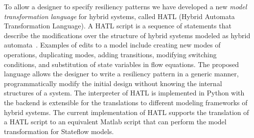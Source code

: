 %
%

%
%
%

%
%
To allow a designer to specify resiliency patterns we have developed a new \emph{model transformation language} for hybrid systems, called HATL (Hybrid Automata Transformation Language).
A HATL script is a sequence of statements that describe the modifications over the structure of hybrid systems modeled as hybrid automata~\cite{alur1995algorithmic}.  Examples of edits to a model include creating new modes of operations, duplicating modes, adding transitions, modifying switching conditions, and substitution of state variables in flow equations. 
%
The proposed language allows the designer to write a resiliency pattern in a generic manner, programmatically modify the initial design without knowing the internal structures of a system. The interpreter of HATL is implemented in Python with the backend is extensible for the translations to different modeling frameworks of hybrid systems. The current implementation of HATL supports the translation of a HATL script to an equivalent Matlab script that can perform the model transformation for Stateflow models.
